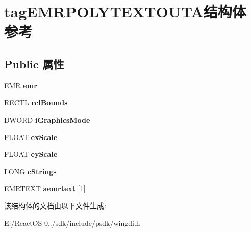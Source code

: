 \hypertarget{structtag_e_m_r_p_o_l_y_t_e_x_t_o_u_t_a}{}\section{tag\+E\+M\+R\+P\+O\+L\+Y\+T\+E\+X\+T\+O\+U\+T\+A结构体 参考}
\label{structtag_e_m_r_p_o_l_y_t_e_x_t_o_u_t_a}
\subsection*{Public 属性}
\begin{DoxyCompactItemize}
\item 
\mbox{\label{structtag_e_m_r_p_o_l_y_t_e_x_t_o_u_t_a_aca30ae8bd991c7c11b4f5f4fedf116c8}} 
\hyperlink{structtag_e_m_r}{E\+MR} {\bfseries emr}
\item 
\mbox{\label{structtag_e_m_r_p_o_l_y_t_e_x_t_o_u_t_a_a416933c7daf8a5474e05663ef5dab684}} 
\hyperlink{struct___r_e_c_t_l}{R\+E\+C\+TL} {\bfseries rcl\+Bounds}
\item 
\mbox{\label{structtag_e_m_r_p_o_l_y_t_e_x_t_o_u_t_a_a37a361f8daecaa94aa23eaea67666f14}} 
D\+W\+O\+RD {\bfseries i\+Graphics\+Mode}
\item 
\mbox{\label{structtag_e_m_r_p_o_l_y_t_e_x_t_o_u_t_a_af41183bde420e57ba3334e17bff7c512}} 
F\+L\+O\+AT {\bfseries ex\+Scale}
\item 
\mbox{\label{structtag_e_m_r_p_o_l_y_t_e_x_t_o_u_t_a_ac6bdd882c1753ab92f2e4dc332fd4122}} 
F\+L\+O\+AT {\bfseries ey\+Scale}
\item 
\mbox{\label{structtag_e_m_r_p_o_l_y_t_e_x_t_o_u_t_a_a5e9ea23ef54dd7684be0984b4e9b2cc3}} 
L\+O\+NG {\bfseries c\+Strings}
\item 
\mbox{\label{structtag_e_m_r_p_o_l_y_t_e_x_t_o_u_t_a_af1280c921f0982e63cee2a102db99ac6}} 
\hyperlink{structtag_e_m_r_t_e_x_t}{E\+M\+R\+T\+E\+XT} {\bfseries aemrtext} \mbox{[}1\mbox{]}
\end{DoxyCompactItemize}


该结构体的文档由以下文件生成\+:\begin{DoxyCompactItemize}
\item 
E\+:/\+React\+O\+S-\/0../sdk/include/psdk/wingdi.\+h\end{DoxyCompactItemize}
